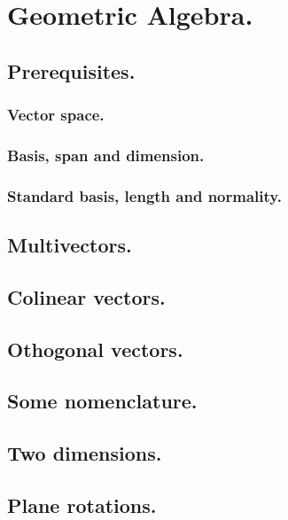 %
%
\chapter{Geometric Algebra.}
   \section{Prerequisites.}
      
      \subsection{Vector space.}
         
         
         
         
      \subsection{Basis, span and dimension.}
         
      \subsection{Standard basis, length and normality.}
         
   \section{Multivectors.}
      
   \section{Colinear vectors.}
      
   \section{Othogonal vectors.}
      
   \section{Some nomenclature.}
      
   \section{Two dimensions.}
      
   \section{Plane rotations.}
      
